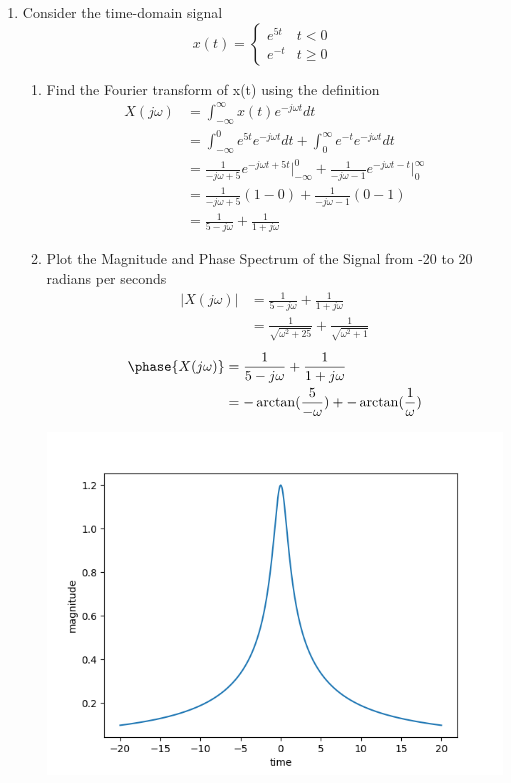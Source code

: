 \documentclass{article}
\begin{document}
\begin{enumerate}
    \item Consider the time-domain signal
    \begin{equation}
        x(t) = \begin{cases}
        e^{5t} &  t < 0\\
        e^{-t} & t \geq 0
        \end{cases}
    \end{equation}
    \begin{enumerate}
        \item Find the Fourier transform of x(t) using the definition
        \begin{align}
            X(j\omega) &= \int_{-\infty}^\infty x(t) e^{-j\omega t}dt\\
            &= \int_{-\infty}^0 e^{5t} e^{-j\omega t}dt+\int_{0}^\infty e^{-t} e^{-j\omega t}dt\\
            &= \frac{1}{-j\omega +5}e^{-j\omega t+5t}\Bigg|_{-\infty}^0 + \frac{1}{-j\omega - 1}e^{-j\omega t-t}\Bigg|_{0}^\infty\\
            &= \frac{1}{-j\omega +5}(1-0) + \frac{1}{-j\omega - 1}(0-1)\\
            &= \boxed{\frac{1}{5 - j\omega } + \frac{1}{1 + j\omega}}
        \end{align}
        \item Plot the Magnitude and Phase Spectrum of the Signal from -20 to 20 radians per seconds
        \begin{align}
            |X(j\omega)| &= \frac{1}{5 - j\omega } + \frac{1}{1 + j\omega}\\
            &= \frac{1}{\sqrt{\omega^2+25}}+\frac{1}{\sqrt{\omega^2+1}}
        \end{align}
        \begin{align}
            \phase{X(j\omega)} &= \frac{1}{5 - j\omega } + \frac{1}{1 + j\omega}\\
            &= -\arctan(\frac{5}{-\omega}) + -\arctan(\frac{1}{\omega})\\
        \end{align}
        \begin{center}
            \includegraphics[width = .35\textwidth]{ps9_problem1b_mag.png}

\end{center}
\end{enumerate}
\end{enumerate}
\end{document}
